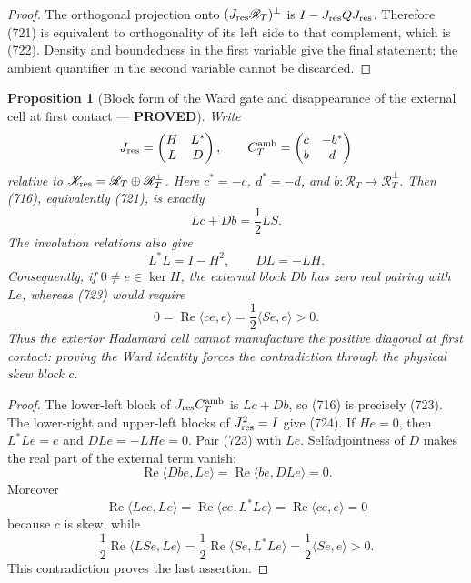 \documentclass[11pt]{article}
\newtheorem{proposition}[theorem]{Proposition}
\newcommand{\PROVED}{\textcolor{green!45!black}{\textbf{PROVED}}}
\begin{document}
\begin{proof}
The orthogonal projection onto
\((J_{\rm res}\mathscr R_T)^\perp\) is
\(I-J_{\rm res}QJ_{\rm res}\).  Therefore (721) is equivalent to
orthogonality of its left side to that complement, which is (722).
Density and boundedness in the first variable give the final statement;
the ambient quantifier in the second variable cannot be discarded.
\end{proof}

\begin{proposition}[Block form of the Ward gate and disappearance of the
external cell at first contact --- \PROVED]
Write
\[
 J_{\rm res}=\begin{pmatrix}H&L^*\\L&D\end{pmatrix},
 \qquad
 C_T^{\rm amb}=\begin{pmatrix}c&-b^*\\b&d\end{pmatrix}
\]
relative to
\(\mathscr K_{\rm res}=\mathscr R_T\oplus\mathscr R_T^\perp\).
Here \(c^*=-c\), \(d^*=-d\), and \(b:\mathscr R_T\to
\mathscr R_T^\perp\).  Then (716), equivalently (721), is exactly
\begin{equation}
 \boxed{Lc+Db=\frac12LS.}                           \tag{723}
\end{equation}
The involution relations also give
\begin{equation}
 L^*L=I-H^2,\qquad DL=-LH.                          \tag{724}
\end{equation}
Consequently, if \(0\ne e\in\ker H\), the external block \(Db\) has
zero real pairing with \(Le\), whereas (723) would require
\[
 0=\operatorname{Re}\langle ce,e\rangle
  =\frac12\langle Se,e\rangle>0.
\]
Thus the exterior Hadamard cell cannot manufacture the positive diagonal
at first contact: proving the Ward identity forces the contradiction
through the physical skew block \(c\).
\end{proposition}

\begin{proof}
The lower-left block of \(J_{\rm res}C_T^{\rm amb}\) is \(Lc+Db\), so
(716) is precisely (723).  The lower-right and upper-left blocks of
\(J_{\rm res}^2=I\) give (724).  If \(He=0\), then
\(L^*Le=e\) and \(DLe=-LHe=0\).  Pair (723) with \(Le\).  Selfadjointness
of \(D\) makes the real part of the external term vanish:
\[
 \operatorname{Re}\langle Dbe,Le\rangle
 =\operatorname{Re}\langle be,DLe\rangle=0.
\]
Moreover
\[
 \operatorname{Re}\langle Lce,Le\rangle
 =\operatorname{Re}\langle ce,L^*Le\rangle
 =\operatorname{Re}\langle ce,e\rangle=0
\]
because \(c\) is skew, while
\[
 \frac12\operatorname{Re}\langle LSe,Le\rangle
 =\frac12\operatorname{Re}\langle Se,L^*Le\rangle
 =\frac12\langle Se,e\rangle>0.
\]
This contradiction proves the last assertion.
\end{proof}
\end{document}
